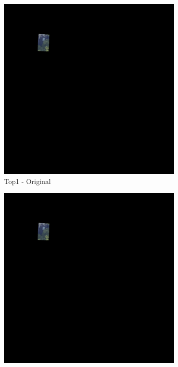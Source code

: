 \begin{figure}[H]
\centering
\begin{subfigure}{0.32\textwidth}
    \includegraphics[width=\textwidth]{02-main//figures/ch4/kfold_ensembles/segformer_tu-regnety_080.ra3_in1k/worst_cases/worst_5_iou0.000_25011115_tile_17_4_52cb42_original.png}
    \caption{Top1 - Original}
\end{subfigure}
\hfill
\begin{subfigure}{0.32\textwidth}
    \includegraphics[width=\textwidth]{02-main//figures/ch4/kfold_ensembles/segformer_tu-regnety_080.ra3_in1k/worst_cases/worst_5_iou0.000_25011115_tile_17_4_52cb42_overlay_gt.png}

\end{subfigure}
\end{figure}
